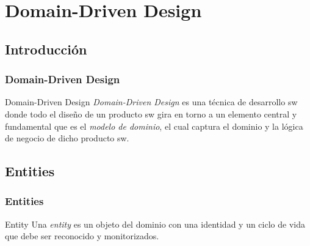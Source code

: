 \documentclass[handout,a4paper,slidestop,xcolor=pst,blue]{beamer}
\begin{document}
\section{Domain-Driven Design}

\subsection{Introducción}

\begin{frame}[c]
    \frametitle{Domain-Driven Design}
     \begin{block}{Domain-Driven Design}
        \alert{\emph{Domain-Driven Design}} es una técnica de desarrollo sw donde todo el diseño de un producto sw gira en torno a un elemento central y fundamental que es el \emph{modelo de dominio}, el cual captura el dominio y la lógica de negocio de dicho producto sw.
     \end{block}
\end{frame}


\subsection{Entities}

\begin{frame}[c]
    \frametitle{Entities}
     \begin{block}{Entity}
        Una \emph{entity} es un objeto del dominio con una identidad y un ciclo de vida que debe ser reconocido y monitorizados.
     \end{block}
\end{frame}
\end{document}
